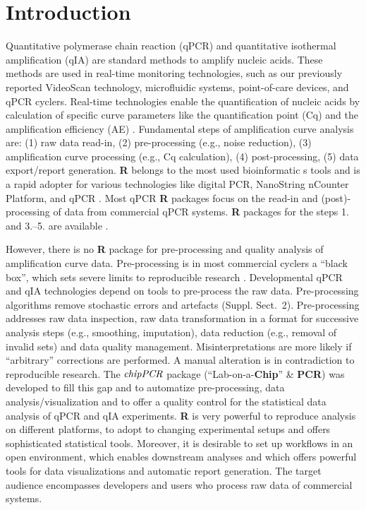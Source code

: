 \documentclass{bioinfo}
\begin{document}
\section{Introduction}

Quantitative polymerase chain reaction (qPCR) and quantitative isothermal 
amplification (qIA) are standard methods to amplify nucleic acids. These methods 
are used in real-time monitoring technologies, such as our previously reported 
VideoScan technology, microfluidic systems, point-of-care devices, and qPCR 
cyclers. Real-time technologies enable the quantification of nucleic acids by 
calculation of specific curve parameters like the quantification point (Cq) and 
the amplification efficiency (AE) 
\citep{roediger_highly_2013,rodiger_nucleic_2014,pabinger_2014}. Fundamental 
steps of amplification curve analysis are: (1) raw data read-in, (2) 
pre-processing (e.g., noise reduction), (3) amplification curve processing 
(e.g., Cq calculation), (4) post-processing, (5) data 
export/report generation. \textbf{R} belongs to the most used bioinformatic	
s tools and is a rapid adopter for various technologies like digital PCR, 
NanoString nCounter Platform, and qPCR \citep{waggott_2012,pabinger_2014}. Most 
qPCR \textbf{R} packages focus on the read-in and (post)-processing of data from 
commercial qPCR systems. \textbf{R} packages for the steps 1. and 3.--5. are 
available \citep{pabinger_2014,perkins_2012,mccall_2014,gehlenborg_2013}.

However, there is no \textbf{R} package for pre-processing and quality analysis 
of amplification curve data. Pre-processing is in most commercial cyclers a 
``black box'', which sets severe limits to reproducible research 
\citep{Leeper_2014}. Developmental qPCR and qIA technologies depend on tools to 
pre-process the raw data. Pre-processing algorithms remove stochastic errors and 
artefacts (Suppl. Sect.~2). Pre-processing addresses raw data %
inspection, raw data transformation in a format for successive analysis steps 
(e.g., smoothing, imputation), data reduction (e.g., removal of invalid sets) 
and data quality management. Misinterpretations are more likely if ``arbitrary'' 
corrections are performed. A manual alteration is in contradiction to 
reproducible research. The $\emph{chipPCR}$ package (``Lab-on-a-\textbf{Chip}'' 
\& \textbf{PCR}) was developed to fill this gap and to automatize 
pre-processing, data analysis/visualization and to offer a quality control for 
the statistical data analysis of qPCR and qIA experiments. \textbf{R} is very 
powerful to reproduce analysis on different platforms, to adopt to changing 
experimental setups and offers sophisticated statistical tools. Moreover, it is 
desirable to set up workflows in an open environment, which enables downstream 
analyses and which offers powerful tools for data visualizations and automatic 
report generation. The target audience encompasses developers and users who 
process raw data of commercial systems.
\end{document}
